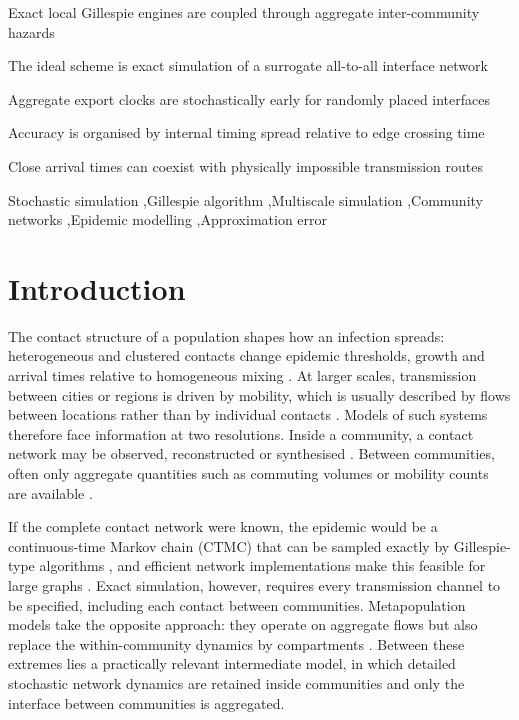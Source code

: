 \documentclass[a4paper,fleqn]{cas-sc}
\begin{document}
\begin{highlights}
\item Exact local Gillespie engines are coupled through aggregate inter-community hazards
\item The ideal scheme is exact simulation of a surrogate all-to-all interface network
\item Aggregate export clocks are stochastically early for randomly placed interfaces
\item Accuracy is organised by internal timing spread relative to edge crossing time
\item Close arrival times can coexist with physically impossible transmission routes
\end{highlights}

\begin{keywords}
Stochastic simulation \sep Gillespie algorithm \sep Multiscale simulation \sep Community networks \sep Epidemic modelling \sep Approximation error
\end{keywords}

\maketitle

\section{Introduction}
\label{sec:introduction}

The contact structure of a population shapes how an infection spreads: heterogeneous and clustered contacts change epidemic thresholds, growth and arrival times relative to homogeneous mixing \citep{keeling2005,pastorsatorras2015,kiss2017}. At larger scales, transmission between cities or regions is driven by mobility, which is usually described by flows between locations rather than by individual contacts \citep{balcan2009,barbosa2018human}. Models of such systems therefore face information at two resolutions. Inside a community, a contact network may be observed, reconstructed or synthesised \citep{eubank2004,danon2011}. Between communities, often only aggregate quantities such as commuting volumes or mobility counts are available \citep{barbosa2018human,chang2021}.

If the complete contact network were known, the epidemic would be a continuous-time Markov chain (CTMC) that can be sampled exactly by Gillespie-type algorithms \citep{gillespie1977exact,gibson2000}, and efficient network implementations make this feasible for large graphs \citep{vestergaard2015,kuryliak2025simulating}. Exact simulation, however, requires every transmission channel to be specified, including each contact between communities. Metapopulation models take the opposite approach: they operate on aggregate flows but also replace the within-community dynamics by compartments \citep{colizza2007reaction,colizza2008,balcan2010modeling,ajelli2010}. Between these extremes lies a practically relevant intermediate model, in which detailed stochastic network dynamics are retained inside communities and only the interface between communities is aggregated.
\end{document}
